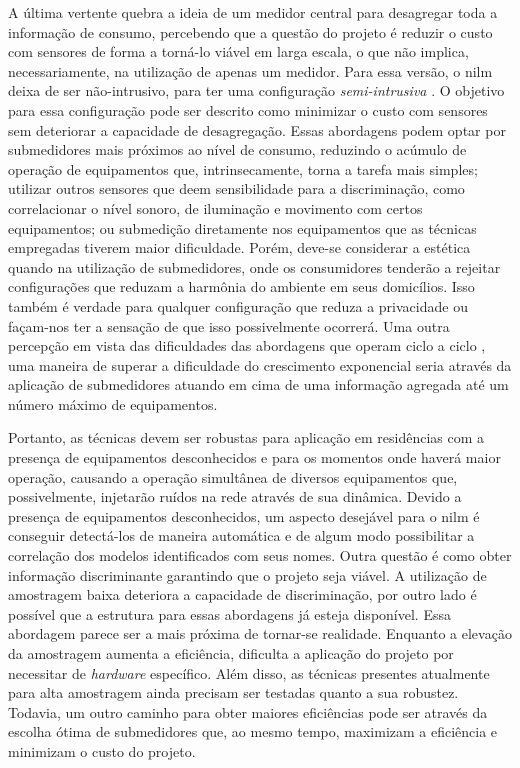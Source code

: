 A última vertente quebra a ideia de um medidor central para desagregar
toda a informação de consumo, percebendo que a questão do projeto é
reduzir o custo com sensores de forma a torná-lo viável em larga
escala, o que não implica, necessariamente, na utilização de apenas um
medidor. Para essa versão, o \gls{nilm} deixa de ser não-intrusivo,
para ter uma configuração \emph{semi-intrusiva}
\cite{seminilm_ihome_tomek_2012,seminilm_fhmm_empiricalnmeter_2013,
seminilm_berges_multisensor_2010}. O objetivo para essa configuração
pode ser descrito como minimizar o custo com sensores sem deteriorar a
capacidade de desagregação. Essas abordagens podem optar por
submedidores mais próximos ao nível de consumo, reduzindo o
acúmulo de operação de equipamentos que, intrinsecamente, torna a tarefa mais
simples; utilizar outros sensores que deem sensibilidade para a
discriminação, como correlacionar o nível sonoro, de iluminação e
movimento com certos equipamentos; ou submedição diretamente nos
equipamentos que as técnicas empregadas tiverem maior dificuldade. Porém,
deve-se considerar a estética quando na utilização de submedidores,
onde os consumidores tenderão a rejeitar configurações que reduzam a
harmônia do ambiente em seus domicílios. Isso também é verdade para
qualquer configuração que reduza a privacidade ou façam-nos ter a
sensação de que isso possivelmente ocorrerá. Uma outra percepção em
vista das dificuldades das abordagens que operam ciclo a ciclo
\cite{nilm_srinivasan_nn_2006_27,
nilm_itajuba_rodrigues,nilm_suzuki_2011_35}, uma maneira de superar a
dificuldade do crescimento exponencial seria através da aplicação de
submedidores atuando em cima de uma informação agregada até um número
máximo de equipamentos.

Portanto, as técnicas devem ser robustas para aplicação em residências
com a presença de equipamentos desconhecidos e para os momentos onde
haverá maior operação, causando a operação simultânea de diversos equipamentos
que, possivelmente, injetarão ruídos na rede através de sua dinâmica.
Devido a presença de equipamentos desconhecidos, um aspecto desejável para
o \gls{nilm} é conseguir detectá-los de maneira automática e de algum
modo possibilitar a correlação dos modelos identificados com seus
nomes. Outra questão é como obter informação discriminante garantindo
que o projeto seja viável. A utilização de amostragem baixa deteriora
a capacidade de discriminação, por outro lado é possível que a
estrutura para essas abordagens já esteja disponível. Essa abordagem
parece ser a mais próxima de tornar-se realidade. Enquanto a elevação
da amostragem aumenta a eficiência, dificulta a aplicação do projeto
por necessitar de \emph{hardware} específico. Além disso, as técnicas
presentes atualmente para alta amostragem ainda precisam ser testadas
quanto a sua robustez. Todavia, um outro caminho para obter maiores
eficiências pode ser através da escolha ótima de submedidores que, ao
mesmo tempo, maximizam a eficiência e minimizam o custo do projeto.

